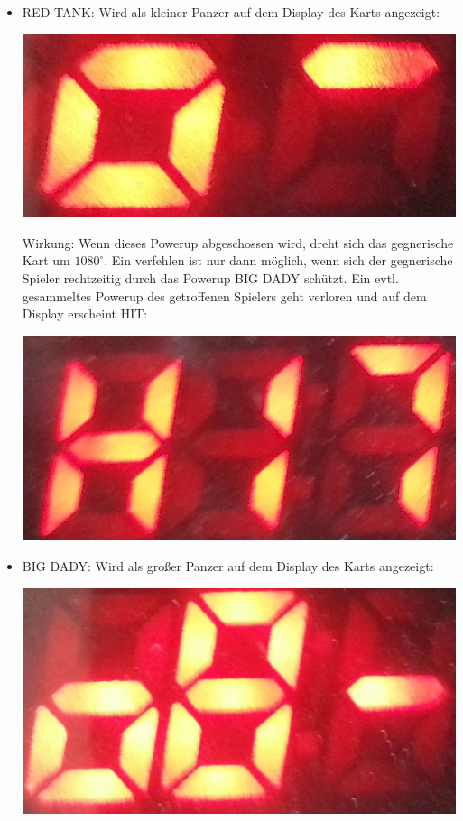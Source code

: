 \begin{itemize}
	\item RED TANK: Wird als kleiner Panzer auf dem Display des Karts angezeigt:
	
	\begin{center}
		\includegraphics[scale=0.3]{Bilder/RED_TANK}
	\end{center}
	
	Wirkung: Wenn dieses Powerup abgeschossen wird, dreht sich das gegnerische Kart um $1080^\circ$. Ein verfehlen ist nur dann möglich, wenn sich der gegnerische Spieler rechtzeitig durch das Powerup BIG DADY schützt. Ein evtl. gesammeltes Powerup des getroffenen Spielers geht verloren und auf dem Display erscheint HIT:
	\begin{center}
		\includegraphics[scale=0.3]{Bilder/ROOMBA_HIT}
	\end{center}
	\item BIG DADY: Wird als großer Panzer auf dem Display des Karts angezeigt:
	
	\begin{center}
		\includegraphics[scale=0.2]{Bilder/BIG_DADY}
	\end{center}
	

\end{itemize}
